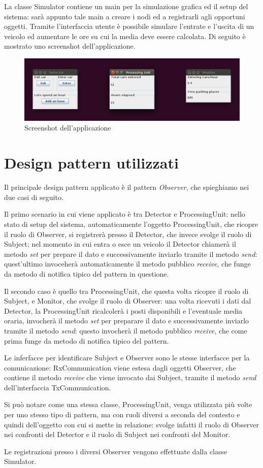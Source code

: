 \documentclass[a4paper,10pt]{article}
\begin{document}
La classe Simulator contiene un main per la simulazione grafica ed il setup del sistema: sarà appunto tale main a creare i nodi ed a registrarli agli opportuni oggetti. Tramite l'interfaccia utente è possibile simulare l'entrate e l'uscita di un veicolo ed aumentare le ore su cui la media deve essere calcolata. Di seguito è mostrato uno screenshot dell'applicazione.

\begin{figure}[htbp]
\includegraphics[scale=0.4]{screenshot.png}
\caption{Screenshot dell'applicazione}
\label{class_dig}
\end{figure}

\section{Design pattern utilizzati}
Il principale design pattern applicato è il pattern \textit{Observer}, che spieghiamo nei due casi di seguito.   

Il primo scenario in cui viene applicato è tra Detector e ProcessingUnit: nello stato di setup del sistema, automaticamente l'oggetto ProcessingUnit, che ricopre il ruolo di Observer, si registrerà presso il Detector, che invece svolge il ruolo di Subject; nel momento in cui entra o esce un veicolo il Detector chiamerà il metodo \textit{set} per prepare il dato e successivamente inviarlo tramite il metodo \textit{send}: quest'ultimo invoceherà automaticamente il metodo pubblico \textit{receive}, che funge da metodo di notifica tipico del pattern in questione.

Il secondo caso è quello tra ProcessingUnit, che questa volta ricopre il ruolo di Subject, e Monitor, che svolge il ruolo di Observer: una volta ricevuti i dati dal Detector, la ProcessingUnit ricalcolerà  i posti disponibili e l'eventuale media oraria, invocherà il metodo \textit{set} per preparare il dato e successivamente inviarlo tramite il metodo \textit{send}: questo invocherà il metodo pubblico \textit{receive}, che come prima funge da metodo di notifica tipico del pattern.

Le inferfacce per identificare Subject e Observer sono le stesse interfacce per la comunicazione: RxCommunication viene estesa dagli oggetti Observer, che contiene il metodo \textit{receive} che viene invocato dai Subject, tramite il metodo \textit{send} dell'interfaccia TxCommunication.

Si può notare come una stessa classe, ProcessingUnit, venga utilizzata più volte per uno stesso tipo di pattern, ma con ruoli diversi a seconda del contesto e quindi dell'oggetto con cui si mette in relazione: svolge infatti il ruolo di Observer nei confronti del Detector e il ruolo di Subject nei confronti del Monitor.

Le registrazioni presso i diversi Observer vengono effettuate dalla classe Simulator.
\end{document}
